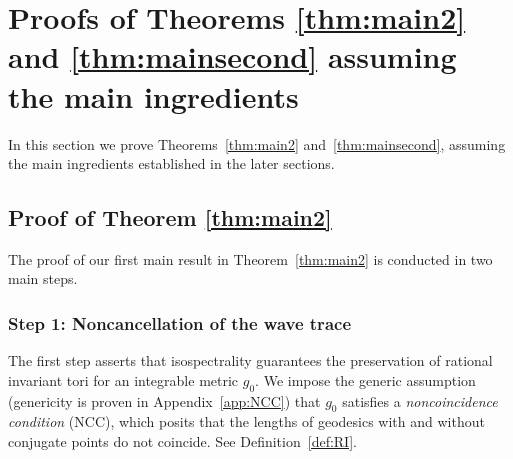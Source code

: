 \documentclass[11pt,letterpaper,oneside]{amsart}
\theoremstyle{definition}
\theoremstyle{remark}
\theoremstyle{definition}
\theoremstyle{remark}
\begin{document}
\section{Proofs of Theorems \ref{thm:main2} and \ref{thm:mainsecond} assuming the main ingredients} \label{subsec:proof}
In this section we prove Theorems~\ref{thm:main2} and~\ref{thm:mainsecond}, assuming the main ingredients established in the later sections.


\subsection{Proof of Theorem \ref{thm:main2}} \label{subsec:proof1}
The proof of our first main result in Theorem~\ref{thm:main2} is conducted in two main steps. 


\subsubsection*{Step 1: Noncancellation of the wave trace} The first step asserts that isospectrality guarantees the preservation of rational invariant tori for an integrable metric $g_0$. We impose the generic assumption (genericity is proven in Appendix~\ref{app:NCC}) that $g_0$ satisfies a \emph{noncoincidence condition} (NCC), which posits that the lengths of geodesics with and without conjugate points do not coincide. See Definition~\ref{def:RI}.
\end{document}
